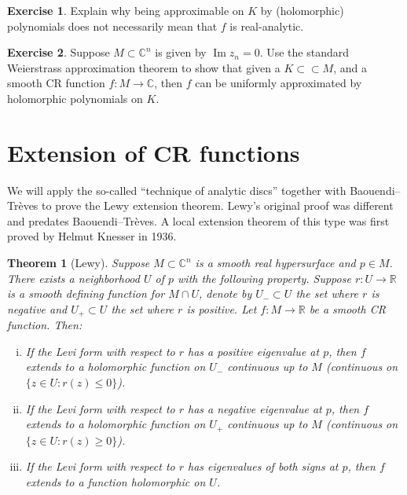 \documentclass[12pt,openany]{book}
\renewcommand{\Im}{\operatorname{Im}}
\newcommand{\C}{{\mathbb{C}}}
\newcommand{\R}{{\mathbb{R}}}
\theoremstyle{plain}
\newtheorem{thm}{Theorem}[section]
\theoremstyle{remark}
\theoremstyle{definition}
\newenvironment{exbox}{%
    \def\FrameCommand{\vrule width 1pt \relax\hspace{10pt}}%
    \MakeFramed{\advance\hsize-\width\FrameRestore}%
}{%
    \endMakeFramed
}
\theoremstyle{exercise}
\newtheorem{exercise}{Exercise}[section]
\theoremstyle{example}
\begin{document}
\begin{exbox}
\begin{exercise}
Explain why being approximable on $K$ by (holomorphic) polynomials does not
necessarily mean that
$f$ is real-analytic.
\end{exercise}

\begin{exercise}
Suppose $M \subset \C^n$ is given by $\Im z_n = 0$.  Use the standard
Weierstrass approximation theorem to show that given a $K \subset \subset M$,
and a smooth CR function $f \colon M \to \C$, then $f$ can be uniformly approximated
by holomorphic polynomials on $K$.
\end{exercise}
\end{exbox}


\section{Extension of CR functions}

We will apply the so-called ``technique of analytic discs'' together
with
Baouendi--Tr{\`e}ves to prove the
Lewy extension theorem.  Lewy's original proof was different
and predates Baouendi--Tr{\`e}ves.  A local extension theorem of this type
was first proved by Helmut Knesser in 1936.

\begin{thm}[Lewy]%
Suppose $M \subset \C^n$ is a smooth real hypersurface and $p \in M$.
There exists a neighborhood $U$ of $p$ with the following
property.
Suppose $r \colon U \to \R$ is
a smooth defining function for $M \cap U$, denote by $U_- \subset U$ the set where $r$
is negative and $U_+ \subset U$ the set where $r$ is positive.
Let $f \colon M \to \R$ be a smooth CR function.
Then:

\begin{enumerate}[(i)]
\item
If the Levi form with respect to $r$ has a positive eigenvalue at $p$, then
$f$ extends to a holomorphic function on $U_-$ continuous up to $M$
(continuous on $\{ z \in U : r(z) \leq 0 \}$).
\item
If the Levi form with respect to $r$ has a negative eigenvalue at $p$, then
$f$ extends to a holomorphic function on $U_+$ continuous up to $M$
(continuous on $\{ z \in U : r(z) \geq 0 \}$).
\item
If the Levi form with respect to $r$ has eigenvalues of both signs at $p$, then
$f$ extends to a function holomorphic on $U$.
\end{enumerate}
\end{thm}
\end{document}
